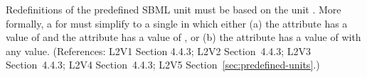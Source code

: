 Redefinitions of the predefined SBML unit  must be based on
the unit
.  More formally, a \UnitDefinition for  must
simplify to a single \Unit in which either (a) the 
attribute has a value of  and the 
attribute has a value of , or (b) the 
attribute has a value of  with any
 value.  (References: L2V1 Section 4.4.3; L2V2
Section~4.4.3; L2V3 Section~4.4.3; L2V4 Section~4.4.3; L2V5 Section~\ref{sec:predefined-units}.)
